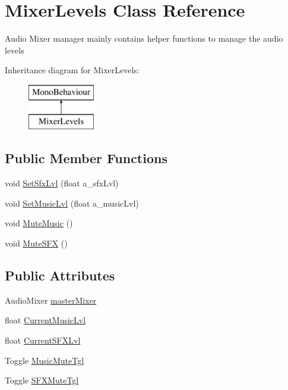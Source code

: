\hypertarget{class_mixer_levels}{}\section{Mixer\+Levels Class Reference}
\label{class_mixer_levels}


Audio Mixer manager mainly contains helper functions to manage the audio levels  


Inheritance diagram for Mixer\+Levels\+:\begin{figure}[H]
\begin{center}
\leavevmode
\includegraphics[height=2.000000cm]{class_mixer_levels}
\end{center}
\end{figure}
\subsection*{Public Member Functions}
\begin{DoxyCompactItemize}
\item 
void \mbox{\hyperlink{class_mixer_levels_aa741d24eedb3578c51d9de783ce3da49}{Set\+Sfx\+Lvl}} (float a\+\_\+sfx\+Lvl)
\item 
void \mbox{\hyperlink{class_mixer_levels_ad23e6afca11d5277b1799b0681bdb0ec}{Set\+Music\+Lvl}} (float a\+\_\+music\+Lvl)
\item 
void \mbox{\hyperlink{class_mixer_levels_a115a44e41393771c433c4f47359f7d5b}{Mute\+Music}} ()
\item 
void \mbox{\hyperlink{class_mixer_levels_a3b4fb0e5913dd3810c201eef23317972}{Mute\+S\+FX}} ()
\end{DoxyCompactItemize}
\subsection*{Public Attributes}
\begin{DoxyCompactItemize}
\item 
Audio\+Mixer \mbox{\hyperlink{class_mixer_levels_a1ca57f242f0eb3070859f9221d81dc19}{master\+Mixer}}
\item 
float \mbox{\hyperlink{class_mixer_levels_a79096ba966c68e6b211bca8246d826a2}{Current\+Music\+Lvl}}
\item 
float \mbox{\hyperlink{class_mixer_levels_a8623b0c2dd656d2fd263b9859d339bd0}{Current\+S\+F\+X\+Lvl}}
\item 
Toggle \mbox{\hyperlink{class_mixer_levels_abfddb3c0ae4ff4dab3690c634505ae14}{Music\+Mute\+Tgl}}
\item 
Toggle \mbox{\hyperlink{class_mixer_levels_acb34a709a53713a45cb437d81273b628}{S\+F\+X\+Mute\+Tgl}}
\end{DoxyCompactItemize}


